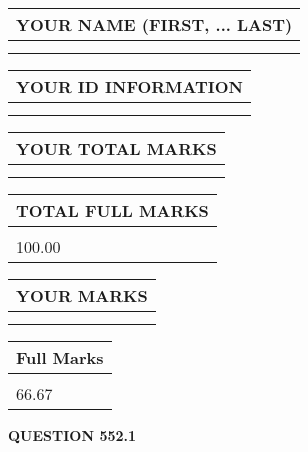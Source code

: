 \documentclass{ctexart}
\begin{document}
   
   
   
\newpage 
\setcounter{page}{ 
   552001 } 
   
   
   
   
\noindent\begin{tabular}{|l|}
\hline
YOUR NAME (FIRST, ... LAST)  \\
\hline
 \\ 
 \\ 
\hline
\end{tabular}
\hspace{0.05in} \begin{tabular}{|l|}
\hline
 YOUR   ID   INFORMATION  \\
\hline
 \\ 
 \\ 
\hline
\end{tabular}
   
   
\vspace{0.2in}\noindent\begin{tabular}{|l|}
\hline
YOUR TOTAL MARKS  \\
\hline
 \\ 
 \\ 
\hline
\end{tabular}
\hspace{0.05in} \begin{tabular}{|l|}
\hline
TOTAL FULL MARKS  \\
\hline
 \\ 
100.00 \\
\hline
\end{tabular}
   
   
 \vspace{0.2in}
 
 
 
 
   
   
  
\vspace{0.2in}
  
\noindent\begin{tabular}{|l|}
\hline
 YOUR MARKS  \\
\hline
 \\ 
 \\ 
\hline
\end{tabular}
\hspace{0.05in} \begin{tabular}{|l|}
\hline
 Full Marks  \\
\hline
 \\ 
66.67 \\
\hline
\end{tabular}
{\textbf{\Large{QUESTION
552.1 
}}}
  
\end{document}
